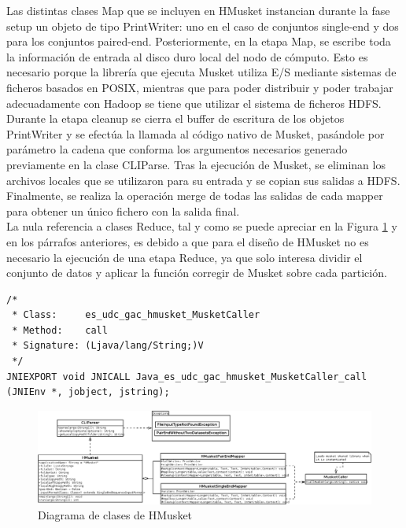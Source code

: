 \documentclass[conference]{IEEEtran}
\begin{document}
Las distintas clases Map que se incluyen en HMusket instancian durante la fase setup un objeto de tipo PrintWriter: uno en el caso de conjuntos single-end y dos para los conjuntos paired-end. Posteriormente, en la etapa Map, se escribe toda la información de entrada al disco duro local del nodo de cómputo. Esto es necesario porque la librería que ejecuta Musket utiliza E/S mediante sistemas de ficheros basados en POSIX, mientras que para poder distribuir y poder trabajar adecuadamente con Hadoop se tiene que utilizar el sistema de ficheros HDFS.\\
Durante la etapa cleanup se cierra el buffer de escritura de los objetos PrintWriter y se efectúa la llamada al código nativo de Musket, pasándole por parámetro la cadena que conforma los argumentos necesarios generado previamente en la clase CLIParse. Tras la ejecución de Musket, se eliminan los archivos locales que se utilizaron para su entrada y se copian sus salidas a HDFS. Finalmente, se realiza la operación merge de todas las salidas de cada mapper para obtener un único fichero con la salida final.\\

La nula referencia a clases Reduce, tal y como se puede apreciar en la Figura \ref{class_diagram} y en los párrafos anteriores, es debido a que para el diseño de HMusket no es necesario la ejecución de una etapa Reduce, ya que solo interesa dividir el conjunto de datos y aplicar la función corregir de Musket sobre cada partición.

\begin{lstlisting}[style=CStyle, caption=Cabecera JNI generada, label=jni_header]
/*
 * Class:     es_udc_gac_hmusket_MusketCaller
 * Method:    call
 * Signature: (Ljava/lang/String;)V
 */
JNIEXPORT void JNICALL Java_es_udc_gac_hmusket_MusketCaller_call (JNIEnv *, jobject, jstring);
\end{lstlisting}

\begin{figure}
	\includegraphics[width=\textwidth]{figures/hmusket.png}
	\caption{Diagrama de clases de HMusket}
	\label{class_diagram}
\end{figure}
\end{document}
